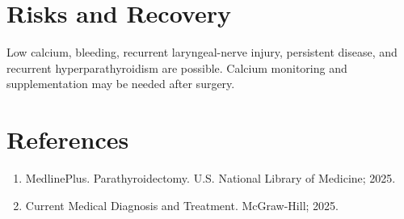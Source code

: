 \section*{Risks and Recovery}
Low calcium, bleeding, recurrent laryngeal-nerve injury, persistent disease, and recurrent hyperparathyroidism are possible. Calcium monitoring and supplementation may be needed after surgery.
\section*{References}
\begin{enumerate}\item MedlinePlus. Parathyroidectomy. U.S. National Library of Medicine; 2025.\item Current Medical Diagnosis and Treatment. McGraw-Hill; 2025.\end{enumerate}
\clearpage
